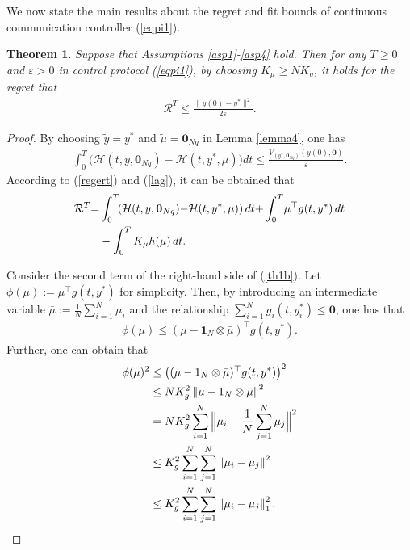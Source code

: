 \documentclass[letterpaper, 10 pt, conference]{ieeeconf}  %
\newtheorem{theorem}{ {Theorem}}
\begin{document}
We now state the main results about the regret and fit bounds of continuous communication controller (\ref{eqpi1}).

\begin{theorem}\label{th1}
	Suppose that Assumptions \ref{asp1}-\ref{asp4} hold. Then for any $T\ge0$ and $\varepsilon>0$ in control protocol (\ref{eqpi1}), by choosing $K_\mu \ge NK_g$, it holds for the regret that
	\begin{align}
		\mathcal{R}^T\le \frac{\|y(0)\!-\!y^*\|^2}{2\varepsilon}.
	\end{align}
\end{theorem}

\begin{proof}
	By choosing $\tilde{y}=y^*$ and $\tilde{\mu}=\boldsymbol{0}_{Nq}$ in Lemma \ref{lemma4}, one has
	\begin{align}
		\int_{0}^{T} \Big(\mathcal{H}(t,y,\boldsymbol{0}_{Nq}) - \mathcal{H}(t,y^*,\mu)\Big)dt\le\frac{V_{(y^*, \boldsymbol{0}_{Nq})}(y(0), \boldsymbol{0})}{\varepsilon}.\label{th1a}
	\end{align}
	According to (\ref{regert}) and (\ref{lag}), it can be obtained that
	\begin{align}
		\mathcal{R}^T{=}
		&\int_{0}^{T} \!\!\left(\mathcal{H}(t,y,\boldsymbol{0}_{Nq}) {-} \mathcal{H}(t,y^*,\mu)\right)dt
		{+}\int_{0}^{T} \!\mu^\top g(t,y^*)\, dt\notag\\
		&-\int_{0}^{T} K_\mu h(\mu)\, dt.\label{th1b}
	\end{align}	
	
	Consider the second term of the right-hand side of (\ref{th1b}). Let $\phi(\mu):=\mu^\top g(t,y^*)$ for simplicity. Then, by introducing an intermediate variable $\bar{\mu}:=\frac{1}{N}\sum_{i=1}^{N}\mu_i$ and the relationship $\sum_{i=1}^{N} g_{i}(t, y_i^*) \le \boldsymbol0$, one has that
	\begin{align}
		\phi(\mu)\le(\mu-\boldsymbol{1}_N\otimes \bar{\mu})^\top g(t,y^*).
	\end{align}
	Further, one can obtain that
	\begin{align}
		\phi(\mu)^2&\le\big((\mu-1_N\otimes \bar{\mu})^\top g(t,y^*)\big)^2\notag\\
		&\le NK_g^2\left\|\mu-1_N\otimes \bar{\mu}\right\|^2\notag\\
		&= NK_g^2 \sum_{i=1}^{N} \Big\|\mu_i-\frac{1}{N}\sum_{j=1}^{N}\mu_j\Big\|^2\notag\\
		&\le K_g^2 \sum_{i=1}^{N} \sum_{j=1}^{N} \left\|\mu_i-\mu_j\right\|^2\notag\\
		&\le K_g^2 \sum_{i=1}^{N} \sum_{j=1}^{N} \left\|\mu_i-\mu_j\right\|_1^2.
	\end{align}
	

\end{proof}
\end{document}
